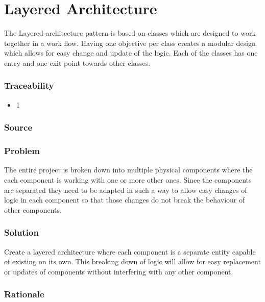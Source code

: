 

\section{Layered Architecture}
	
	The Layered architecture pattern is based on classes which are designed to work together in a work flow. Having one objective per class creates a modular design which allows for easy change and update of the logic. Each of the classes has one entry and one exit point towards other classes. 
	
	\subsubsection{Traceability} 
		\begin{itemize}
			\item 1
		\end{itemize}

	\subsubsection{Source} \cite{book:design-patterns}

	\subsubsection{Problem}

	The entire project is broken down into multiple physical components where the each component is working with one or more other ones. Since the components are separated they need to be adapted in such a way to allow easy changes of logic in each component so that those changes do not break the behaviour of other components.

	\subsubsection{Solution} 

	Create a layered architecture where each component is a separate entity capable of existing on its own. This breaking down of logic will allow for easy replacement or updates of components without interfering with any other component. 

	\subsubsection{Rationale} \label{Layers:rationale}

